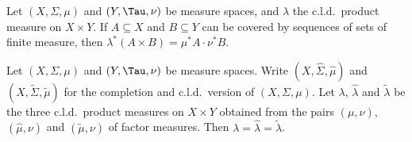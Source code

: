  Let $(X,\Sigma,\mu)$ and $(Y,\Tau,\nu)$ be
measure spaces, and $\lambda$ the c.l.d.\ product
measure on $X\times Y$.   If
$A\subseteq X$ and $B\subseteq Y$ can be covered by sequences of sets of
finite measure, then $\lambda^*(A\times
B)=\mu^*A\cdot\nu^*B$.


 Let $(X,\Sigma,\mu)$ and $(Y,\Tau,\nu)$ be
measure spaces.   Write $(X,\hat\Sigma,\hat\mu)$ and
$(X,\tilde\Sigma,\tilde\mu)$ for the completion and c.l.d.\ version of
$(X,\Sigma,\mu)$.   Let $\lambda$, $\hat\lambda$
and $\tilde\lambda$ be the three c.l.d.\ product measures on $X\times Y$
obtained from the pairs $(\mu,\nu)$, $(\hat\mu,\nu)$ and
$(\tilde\mu,\nu)$
of factor measures.   Then $\lambda=\hat\lambda=\tilde\lambda$.

